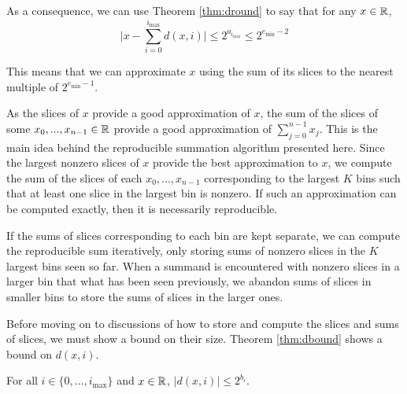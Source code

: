     As a consequence, we can use Theorem \ref{thm:dround} to say that for any $x \in \mathbb{R}$,
    \begin{equation}
      \bigl|x - \sum\limits_{i = 0}^{i_{\max}} d(x, i)\bigr| \leq 2^{a_{i_{\max}}} \leq 2^{e_{\min} - 2}
      \label{eq:droundunderflow}
    \end{equation}

    This means that we can approximate $x$ using the sum of its slices to the
    nearest multiple of $2^{e_{\min}-1}$.

    As the slices of $x$ provide a good approximation of $x$, the sum of the slices of some $x_0, ..., x_{n - 1} \in \mathbb{R}$ provide a good approximation of $\sum\limits_{j = 0}^{n - 1} x_j$. This is the main idea behind the reproducible summation algorithm presented here.
    Since the largest nonzero slices of $x$ provide the best approximation to $x$, we compute the sum of the slices of each $x_0, ..., x_{n - 1}$ corresponding to the largest $K$ bins such that at least one slice in the largest bin is nonzero. If such an approximation can be computed exactly, then it is necessarily reproducible.

    If the sums of slices corresponding to each bin are kept separate, we can compute the reproducible sum iteratively, only storing sums of nonzero slices in the $K$ largest bins seen so far. When a summand is encountered with nonzero slices in a larger bin that what has been seen previously, we abandon sums of slices in smaller bins to store the sums of slices in the larger ones.

    Before moving on to discussions of how to store and compute the slices and sums of slices, we must show a bound on their size. Theorem \ref{thm:dbound} shows a bound on $d(x, i)$.

    \begin{samepage}
    \begin{thm}
      For all $i \in \{0, ..., i_{\max}\}$ and $x \in \mathbb{R}$, $|d(x, i)| \leq 2^{b_i}$.
      \label{thm:dbound}
    \end{thm}
    \end{samepage}

